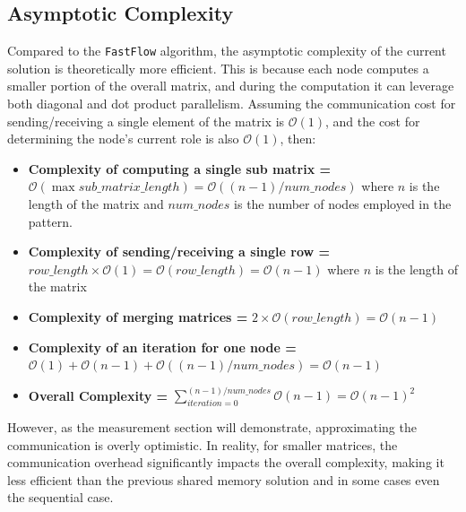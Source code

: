 \subsection*{Asymptotic Complexity}
Compared to the \texttt{FastFlow} algorithm, the asymptotic complexity of the current solution is theoretically more efficient. This is because each node computes a smaller portion of the overall matrix, and during the computation it can leverage both diagonal and dot product parallelism. Assuming the communication cost for sending/receiving  a single element of the matrix is $\mathcal{O}(1)$, and the cost for determining the node's current role is also $\mathcal{O}(1)$, then:
\begin{itemize}


    \item \textbf{Complexity of computing a single sub matrix =} $\mathcal{O}(\max{sub\_matrix\_length}) = \mathcal{O}((n-1)/ num\_nodes )$ where $n$ is the length of the matrix and $num\_nodes$ is the number of nodes employed in the pattern.

    \item \textbf{Complexity of sending/receiving a single row =} $row\_length \times \mathcal{O}(1) = \mathcal{O}(row\_length) = \mathcal{O}(n - 1)$ where $n$ is the length of the matrix

    \item \textbf{Complexity of merging matrices =} $2 \times \mathcal{O}(row\_length) = \mathcal{O}(n - 1)$

    \item \textbf{Complexity of an iteration for one node =} $ \mathcal{O}(1) + \mathcal{O}(n - 1) + \mathcal{O}((n-1)/ num\_nodes) = \mathcal{O}(n-1)$

    \item \textbf{Overall Complexity =} $ \sum_{iteration = 0}^{(n-1) / num\_nodes}{\mathcal{O}(n-1)} = \mathcal{O}(n-1)^{2}$
\end{itemize}

However, as the measurement section will demonstrate, approximating the communication is overly optimistic. In reality, for smaller matrices, the communication overhead significantly impacts the overall complexity, making it less efficient than the previous shared memory solution and in some cases even the sequential case.

